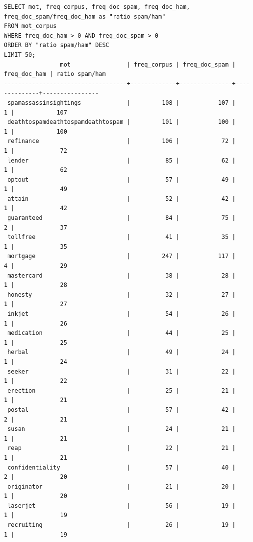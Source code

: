 \documentclass[a4paper,12pt]{article}
\begin{document}
	\begin{verbatim}
SELECT mot, freq_corpus, freq_doc_spam, freq_doc_ham, 
freq_doc_spam/freq_doc_ham as "ratio spam/ham"
FROM mot_corpus
WHERE freq_doc_ham > 0 AND freq_doc_spam > 0
ORDER BY "ratio spam/ham" DESC
LIMIT 50;
                mot                | freq_corpus | freq_doc_spam | freq_doc_ham | ratio spam/ham 
-----------------------------------+-------------+---------------+--------------+----------------
 spamassassinsightings             |         108 |           107 |            1 |            107
 deathtospamdeathtospamdeathtospam |         101 |           100 |            1 |            100
 refinance                         |         106 |            72 |            1 |             72
 lender                            |          85 |            62 |            1 |             62
 optout                            |          57 |            49 |            1 |             49
 attain                            |          52 |            42 |            1 |             42
 guaranteed                        |          84 |            75 |            2 |             37
 tollfree                          |          41 |            35 |            1 |             35
 mortgage                          |         247 |           117 |            4 |             29
 mastercard                        |          38 |            28 |            1 |             28
 honesty                           |          32 |            27 |            1 |             27
 inkjet                            |          54 |            26 |            1 |             26
 medication                        |          44 |            25 |            1 |             25
 herbal                            |          49 |            24 |            1 |             24
 seeker                            |          31 |            22 |            1 |             22
 erection                          |          25 |            21 |            1 |             21
 postal                            |          57 |            42 |            2 |             21
 susan                             |          24 |            21 |            1 |             21
 reap                              |          22 |            21 |            1 |             21
 confidentiality                   |          57 |            40 |            2 |             20
 originator                        |          21 |            20 |            1 |             20
 laserjet                          |          56 |            19 |            1 |             19
 recruiting                        |          26 |            19 |            1 |             19

\end{verbatim}
\end{document}
